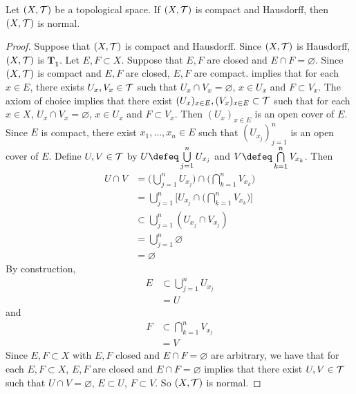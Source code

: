 \documentclass{book}
\begin{document}
	\begin{ex} 
		Let $(X, \mathcal{T})$ be a topological space. If $(X, \mathcal{T})$ is compact and Hausdorff, then $(X, \mathcal{T})$ is normal.
	\end{ex}
	
	\begin{proof}
		Suppose that $(X, \mathcal{T})$ is compact and Hausdorff. Since $(X, \mathcal{T})$ is Hausdorff, $(X, \mathcal{T})$ is $\mathbf{T_1}$. Let $E, F \subset X$. Suppose that $E, F$ are closed and $E \cap F = \varnothing$. Since $(X, \mathcal{T})$ is compact and $E,F$ are closed, $E,F$ are compact.  implies that for each $x \in E$, there exists $U_x, V_x \in \mathcal{T}$ such that $U_x \cap V_x = \varnothing$, $x \in U_x$ and $F \subset V_x$. The axiom of choice implies that there exist $(U_x)_{x \in E}, (V_x)_{x \in E} \subset \mathcal{T}$ such that for each $x \in X$, $U_x \cap V_x = \varnothing$, $x \in U_x$ and $F \subset V_x$. Then $(U_x)_{x \in E}$ is an open cover of $E$. Since $E$ is compact, there exist $x_1, \ldots, x_n \in E$ such that $(U_{x_j})_{j=1}^n$ is an open cover of $E$. Define $U, V \in \mathcal{T}$ by $U \defeq \bigcup\limits_{j=1}^n U_{x_j}$ and $V \defeq \bigcap\limits_{k=1}^n V_{x_k}$. Then
		\begin{align*}
			U \cap V
			& = \bigg( \bigcup\limits_{j=1}^n U_{x_j} \bigg) \cap \bigg( \bigcap\limits_{k=1}^n V_{x_k} \bigg) \\
			& = \bigcup\limits_{j=1}^n \bigg[ U_{x_j} \cap \bigg( \bigcap\limits_{k=1}^n V_{x_k} \bigg) \bigg] \\
			& \subset \bigcup\limits_{j=1}^n ( U_{x_j} \cap V_{x_j} ) \\ 
			& = \bigcup\limits_{j=1}^n \varnothing \\
			& = \varnothing
		\end{align*}
		By construction,
		\begin{align*}
			E 
			& \subset \bigcup\limits_{j=1}^n U_{x_j} \\
			& = U
		\end{align*}
		and 
		\begin{align*}
			F 
			& \subset \bigcap\limits_{k=1}^n V_{x_j} \\
			& = V
		\end{align*}
		Since $E, F \subset X$ with $E,F$ closed and $E \cap F = \varnothing$ are arbitrary, we have that for each $E, F \subset X$, $E,F$ are closed and $E \cap F = \varnothing$ implies that there exist $U,V \in \mathcal{T}$ such that $U \cap V = \varnothing$, $E \subset U$, $F \subset V$. So $(X, \mathcal{T})$ is normal.
	\end{proof}
		
\end{document}
